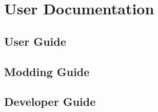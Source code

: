 \section{User Documentation} \label{sec:userdocumentation}


\subsection{User Guide}

\subsection{Modding Guide}

\subsection{Developer Guide}
